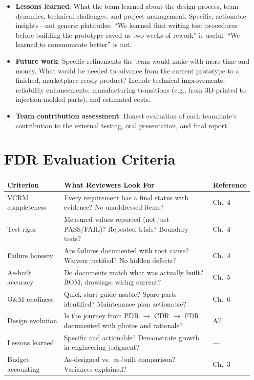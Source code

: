 \documentclass[11pt,letterpaper,twoside,openany]{book}
\begin{document}
\begin{itemize}[leftmargin=1.5em]
\item \textbf{Lessons learned}: What the team learned about the design process, team dynamics, technical challenges, and project management. Specific, actionable insights---not generic platitudes. ``We learned that writing test procedures before building the prototype saved us two weeks of rework'' is useful. ``We learned to communicate better'' is not.
\item \textbf{Future work}: Specific refinements the team would make with more time and money. What would be needed to advance from the current prototype to a finished, marketplace-ready product? Include technical improvements, reliability enhancements, manufacturing transitions (e.g., from 3D-printed to injection-molded parts), and estimated costs.
\item \textbf{Team contribution assessment}: Honest evaluation of each teammate's contribution to the external testing, oral presentation, and final report.
\end{itemize}

\FloatBarrier
\section{FDR Evaluation Criteria}

\begin{center}
\small
\begin{tabularx}{\textwidth}{l X l}
\toprule
\textbf{Criterion} & \textbf{What Reviewers Look For} & \textbf{Reference} \\
\midrule
VCRM completeness & Every requirement has a final status with evidence? No unaddressed items? & Ch.~4 \\
Test rigor & Measured values reported (not just PASS/FAIL)? Repeated trials? Boundary tests? & Ch.~4 \\
Failure honesty & Are failures documented with root cause? Waivers justified? No hidden defects? & Ch.~4 \\
As-built accuracy & Do documents match what was actually built? BOM, drawings, wiring current? & Ch.~5 \\
O\&M readiness & Quick-start guide usable? Spare parts identified? Maintenance plan actionable? & Ch.~6 \\
Design evolution & Is the journey from PDR $\to$ CDR $\to$ FDR documented with photos and rationale? & All \\
Lessons learned & Specific and actionable? Demonstrate growth in engineering judgment? & --- \\
Budget accounting & As-designed vs.\ as-built comparison? Variances explained? & Ch.~3 \\
\bottomrule
\end{tabularx}
\end{center}
\end{document}
